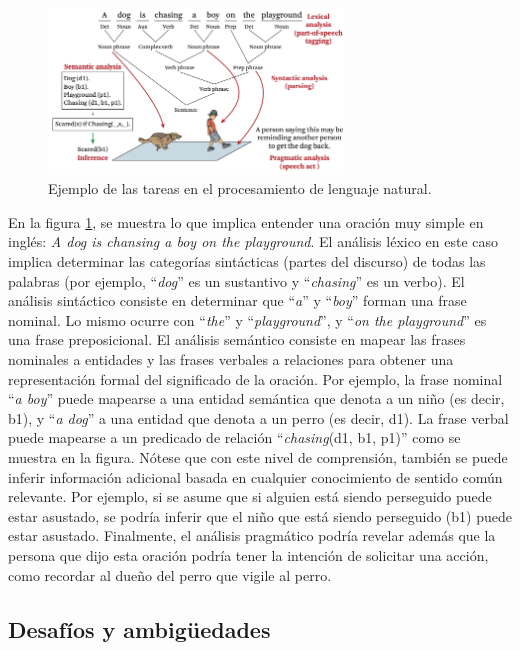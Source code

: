 \begin{figure}[h]
\centering
\includegraphics[width=0.7\textwidth]{fotos/2.png}
\caption{Ejemplo de las tareas en el procesamiento de lenguaje natural.}
\label{fig:3.1}
\end{figure}

En la figura \ref{fig:3.1}, se muestra lo que implica entender una oración muy simple en inglés: \textit{A dog is chansing a boy on the playground}. El análisis léxico en este caso implica determinar las categorías sintácticas (partes del discurso) de todas las palabras (por ejemplo, ``\textit{dog}'' es un sustantivo y ``\textit{chasing}'' es un verbo). El análisis sintáctico consiste en determinar que ``\textit{a}'' y ``\textit{boy}'' forman una frase nominal. Lo mismo ocurre con ``\textit{the}'' y ``\textit{playground}'', y ``\textit{on the playground}'' es una frase preposicional. El análisis semántico consiste en mapear las frases nominales a entidades y las frases verbales a relaciones para obtener una representación formal del significado de la oración. Por ejemplo, la frase nominal ``\textit{a boy}'' puede mapearse a una entidad semántica que denota a un niño (es decir, b1), y ``\textit{a dog}'' a una entidad que denota a un perro (es decir, d1). La frase verbal puede mapearse a un predicado de relación ``\textit{chasing}(d1, b1, p1)'' como se muestra en la figura. Nótese que con este nivel de comprensión, también se puede inferir información adicional basada en cualquier conocimiento de sentido común relevante. Por ejemplo, si se asume que si alguien está siendo perseguido puede estar asustado, se podría inferir que el niño que está siendo perseguido (b1) puede estar asustado. Finalmente, el análisis pragmático podría revelar además que la persona que dijo esta oración podría tener la intención de solicitar una acción, como recordar al dueño del perro que vigile al perro. 

\subsection{Desafíos y ambigüedades}

